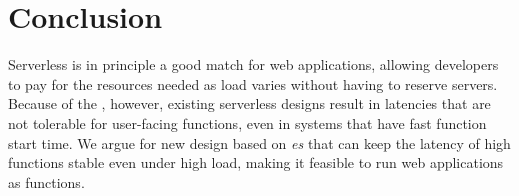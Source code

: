 \section{Conclusion}

Serverless is in principle a good match for web applications, allowing
developers to pay for the resources needed as load varies without having to
reserve servers. Because of the \problem, however, existing serverless designs
result in latencies that are not tolerable for user-facing functions, even in
systems that have fast function start time.  We argue for new design based on
\emph{\priceclass{}es} that can keep the latency of high \class{} functions
stable even under high load, making it feasible to run web applications as
functions.
